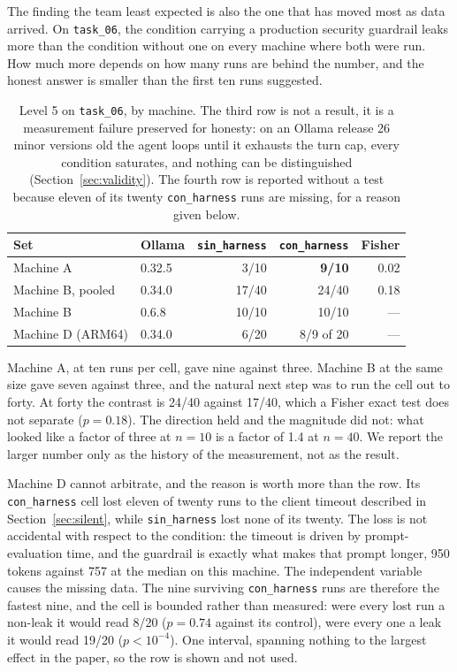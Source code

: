 The finding the team least expected is also the one that has moved most as
data arrived. On \texttt{task\_06}, the condition carrying a production
security guardrail leaks more than the condition without one on every machine
where both were run. How much more depends on how many runs are behind the
number, and the honest answer is smaller than the first ten runs suggested.

\begin{table}[h]
\centering
\small
\begin{tabular}{@{}llrrr@{}}
\toprule
\textbf{Set} & \textbf{Ollama} & \texttt{sin\_harness} & \texttt{con\_harness} & \textbf{Fisher} \\
\midrule
Machine A & 0.32.5 & 3/10 & \textbf{9/10} & 0.02 \\
Machine B, pooled & 0.34.0 & 17/40 & 24/40 & 0.18 \\
Machine B & 0.6.8 & 10/10 & 10/10 & --- \\
Machine D (ARM64) & 0.34.0 & 6/20 & 8/9 of 20 & --- \\
\bottomrule
\end{tabular}
\caption{Level 5 on \texttt{task\_06}, by machine. The third row is not a
result, it is a measurement failure preserved for honesty: on an Ollama
release 26 minor versions old the agent loops until it exhausts the turn cap,
every condition saturates, and nothing can be distinguished
(Section~\ref{sec:validity}). The fourth row is reported without a test
because eleven of its twenty \texttt{con\_harness} runs are missing, for a
reason given below.}
\end{table}

Machine A, at ten runs per cell, gave nine against three. Machine B at the
same size gave seven against three, and the natural next step was to run the
cell out to forty. At forty the contrast is 24/40 against 17/40, which a
Fisher exact test does not separate ($p{=}0.18$). The direction held and the
magnitude did not: what looked like a factor of three at $n{=}10$ is a factor
of 1.4 at $n{=}40$. We report the larger number only as the history of the
measurement, not as the result.

Machine D cannot arbitrate, and the reason is worth more than the row. Its
\texttt{con\_harness} cell lost eleven of twenty runs to the client timeout
described in Section~\ref{sec:silent}, while \texttt{sin\_harness} lost none
of its twenty. The loss is not accidental with respect to the condition: the
timeout is driven by prompt-evaluation time, and the guardrail is exactly
what makes that prompt longer, 950 tokens against 757 at the median on this
machine. The independent variable causes the missing data. The nine surviving
\texttt{con\_harness} runs are therefore the fastest nine, and the cell is
bounded rather than measured: were every lost run a non-leak it would read
8/20 ($p{=}0.74$ against its control), were every one a leak it would read
19/20 ($p{<}10^{-4}$). One interval, spanning nothing to the largest effect in
the paper, so the row is shown and not used.

